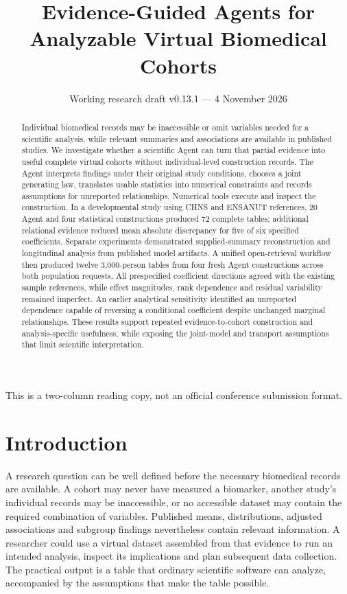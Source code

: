 \documentclass[10pt,twocolumn]{article}
\title{Evidence-Guided Agents for Analyzable Virtual Biomedical Cohorts}
\author{\small Working research draft v0.13.1 --- 4 November 2026}
\date{}
\begin{document}
\maketitle
\begingroup\footnotesize\noindent This is a two-column reading copy, not an official conference submission format.\par\endgroup
\begin{abstract}

Individual biomedical records may be inaccessible or omit variables needed for a scientific analysis, while relevant summaries and associations are available in published studies. We investigate whether a scientific Agent can turn that partial evidence into useful complete virtual cohorts without individual-level construction records. The Agent interprets findings under their original study conditions, chooses a joint generating law, translates usable statistics into numerical constraints and records assumptions for unreported relationships. Numerical tools execute and inspect the construction. In a developmental study using CHNS and ENSANUT references, 20 Agent and four statistical constructions produced 72 complete tables; additional relational evidence reduced mean absolute discrepancy for five of six specified coefficients. Separate experiments demonstrated supplied-summary reconstruction and longitudinal analysis from published model artifacts. A unified open-retrieval workflow then produced twelve 3,000-person tables from four fresh Agent constructions across both population requests. All prespecified coefficient directions agreed with the existing sample references, while effect magnitudes, rank dependence and residual variability remained imperfect. An earlier analytical sensitivity identified an unreported dependence capable of reversing a conditional coefficient despite unchanged marginal relationships. These results support repeated evidence-to-cohort construction and analysis-specific usefulness, while exposing the joint-model and transport assumptions that limit scientific interpretation.

\end{abstract}

\section{Introduction}

A research question can be well defined before the necessary biomedical records are available. A cohort may never have measured a biomarker, another study's individual records may be inaccessible, or no accessible dataset may contain the required combination of variables. Published means, distributions, adjusted associations and subgroup findings nevertheless contain relevant information. A researcher could use a virtual dataset assembled from that evidence to run an intended analysis, inspect its implications and plan subsequent data collection. The practical output is a table that ordinary scientific software can analyze, accompanied by the assumptions that make the table possible.
\end{document}
